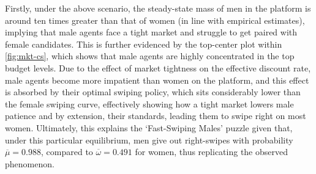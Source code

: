 Firstly, under the above scenario, the steady-state mass of men in the platform is around ten times greater than that of women (in line with empirical estimates), implying that male agents face a tight market and struggle to get paired with female candidates. This is further evidenced by the top-center plot within \autoref{fig:mkt-cs}, which shows that male agents are highly concentrated in the top budget levels. Due to the effect of market tightness on the effective discount rate, male agents become more impatient than women on the platform, and this effect is absorbed by their optimal swiping policy, which sits considerably lower than the female swiping curve, effectively showing how a tight market lowers male patience and by extension, their standards, leading them to swipe right on most women. Ultimately, this explains the `Fast-Swiping Males' puzzle given that, under this particular equilibrium, men give out right-swipes with probability $\overline\mu=0.988$, compared to $\overline\omega=0.491$ for women, thus replicating the observed phenomenon.